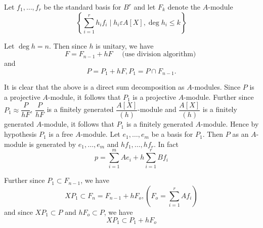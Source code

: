 \begin{Proof}
Let $f_1,\ldots,f_r$ be the standard basis for $B^{r}$ and let $F_k$
denote the $A$-module
$$
\left\{\sum\limits_{i=1}^{r}h_if_i\mid h_i\varepsilon A[X],\deg
h_i\leq k\right\}
$$

Let $\deg h=n$. Then since $h$ is unitary, we have 
$$
F=F_{n-1}+hF\quad \text{ (use division algorithm) }
$$
and
$$
P=P_1+hF, P_1=P\cap F_{n-1}.
$$

It is clear that the above is a direct sum decomposition as
$A$-modules. Since $P$ is a projective $A$-module, it follows that
$P_1$ is a projective $A$-module. Further since $P_1\approx
\dfrac{P}{hF}$, $\dfrac{P}{hF}$ is a finitely generated
$\dfrac{A[X]}{(h)}$-module and $\dfrac{A[X]}{(h)}$ is a finitely
generated $A$-module, it follows that $P_1$ is a finitely generated
$A$-module. Hence by hypothesis $P_1$ is a free $A$-module. Let
$e_1,\ldots,e_m$ be a basis for $P_1$. Then $P$ as an $A$-module is
generated by $e_1,\ldots,e_m$ and $hf_1,\ldots,hf_r$. In fact
$$
p=\sum\limits_{i=1}^{m}Ae_i+h\sum\limits_{i=1}^{r}Bf_i
$$

Further since $P_1\subset F_{n-1}$, we have
$$
XP_1\subset F_n=F_{n-1}+hF_o,\left(F_o=\sum\limits_{i=1}^{r}Af_i\right)
$$
and since $XP_1\subset P$ and $hF_o\subset P$, we have 
$$
XP_1\subset P_1+hF_o
$$


\end{Proof}
